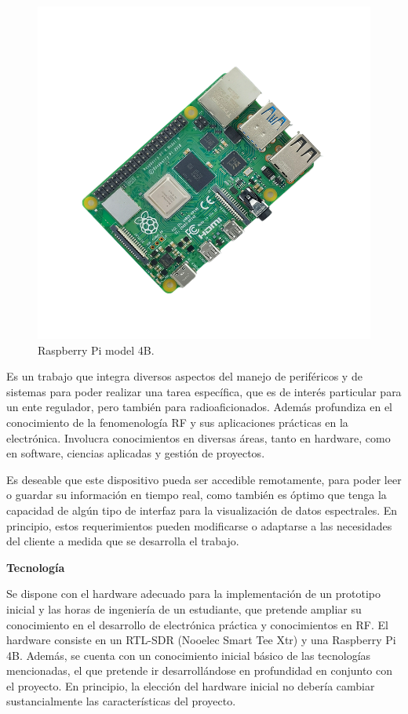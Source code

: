 \documentclass[
11pt, %
codirector, %
]{charter}
\begin{document}
\begin{figure}[H]
\centering 
\includegraphics[width=.65\textwidth]{./Figuras/Raspi4B.png} 
\caption{Raspberry Pi model 4B.}
\label{fig:diagBloques}
\end{figure}

Es un trabajo que integra diversos aspectos del manejo de periféricos y de sistemas para poder realizar una tarea específica, que es de interés particular para un ente regulador, pero también para radioaficionados. Además profundiza en el conocimiento de la fenomenología RF y sus aplicaciones prácticas en la electrónica. Involucra conocimientos en diversas áreas, tanto en hardware, como en software, ciencias aplicadas y gestión de proyectos.

Es deseable que este dispositivo pueda ser accedible remotamente, para poder leer o guardar su información en tiempo real, como también es óptimo que tenga la capacidad de algún tipo de interfaz para la visualización de datos espectrales. En principio, estos requerimientos pueden modificarse o adaptarse a las necesidades del cliente a medida que se desarrolla el trabajo. 

\textbf{Tecnología}

Se dispone con el hardware adecuado para la implementación de un prototipo inicial y las horas de ingeniería de un estudiante, que pretende ampliar su conocimiento en el desarrollo de electrónica práctica y conocimientos en RF. El hardware consiste en un RTL-SDR (Nooelec Smart Tee Xtr) y una Raspberry Pi 4B. Además, se cuenta con un conocimiento inicial básico de las tecnologías mencionadas, el que pretende ir desarrollándose en profundidad en conjunto con el proyecto. En principio, la elección del hardware inicial no debería cambiar sustancialmente las características del proyecto.
\end{document}
